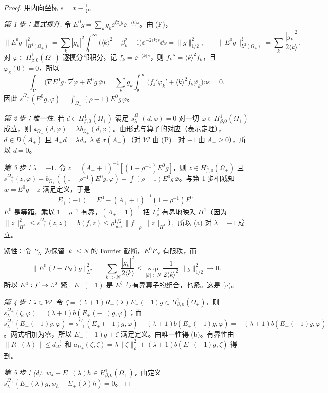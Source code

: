 \documentclass[11pt,a4paper,fontset=fandol]{ctexart}
\begin{document}
\begin{proof}
用内向坐标 $s=x-\tfrac12$。

\emph{第 1 步：显式提升.} 令 $E^0g=\sum_kg_k\ee^{\ii\beta_ky}\ee^{-\langle k\rangle s}$。由 (F)，
\[
\|E^0g\|_{H^1(\Omega_+)}^2=\sum_k|g_k|^2\int_0^\infty\bigl(\langle k\rangle^2+\beta_k^2+1\bigr)\ee^{-2\langle k\rangle s}\dd s=\|g\|_{1/2}^2,\qquad
\|E^0g\|_{L^2(\Omega_+)}^2=\sum_k\frac{|g_k|^2}{2\langle k\rangle}.
\]
对 $\varphi\in H^1_{\beta,0}(\Omega_+)$ 逐模分部积分。记 $f_k=\ee^{-\langle k\rangle s}$，则 $f_k''=\langle k\rangle^2f_k$，且 $\varphi_k(0)=0$，所以
\[
\int_{\Omega_+}\bigl(\nabla E^0g\cdot\overline{\nabla\varphi}+E^0g\,\overline\varphi\bigr)=\sum_kg_k\int_0^\infty\bigl(f_k'\overline{\varphi_k'}+\langle k\rangle^2f_k\overline{\varphi_k}\bigr)\dd s=0 .
\]
因此 $s^{\Omega_+}_{-1}(E^0g,\varphi)=\int_{\Omega_+}(\rho-1)E^0g\,\overline\varphi$。

\emph{第 2 步：唯一性.} 若 $d\in H^1_{\beta,0}(\Omega_+)$ 满足 $s^{\Omega_+}_\lambda(d,\varphi)=0$ 对一切 $\varphi\in H^1_{\beta,0}(\Omega_+)$ 成立，则 $a_{\Omega_+}(d,\varphi)=\lambda b_{\Omega_+}(d,\varphi)$。由形式与算子的对应（表示定理），$d\in D(A_+)$ 且 $A_+d=\lambda d$。$\lambda\notin\sigma(A_+)$（对 $\mathcal W$ 由 (P)，对 $-1$ 由 $A_+\ge0$），所以 $d=0$。

\emph{第 3 步：$\lambda=-1$.} 令 $z=(A_++1)^{-1}[(1-\rho^{-1})E^0g]$，则 $z\in H^1_{\beta,0}(\Omega_+)$ 且 $s^{\Omega_+}_{-1}(z,\varphi)=b_{\Omega_+}((1-\rho^{-1})E^0g,\varphi)=\int(\rho-1)E^0g\,\overline\varphi$。与第 1 步相减知 $w=E^0g-z$ 满足定义，于是
\[
E_+(-1)=E^0-(A_++1)^{-1}(1-\rho^{-1})E^0 .
\]
$E^0$ 是等距，乘以 $1-\rho^{-1}$ 有界，$(A_++1)^{-1}$ 把 $L^2_\rho$ 有界地映入 $H^1$（因为 $\|z\|_{H^1}^2\le s_{-1}^{\Omega_+}(z,z)=b(f,z)\le\rho_{\max}^{1/2}\|f\|_\rho\|z\|_{H^1}$），所以 (a) 对 $\lambda=-1$ 成立。

紧性：令 $P_N$ 为保留 $|k|\le N$ 的 Fourier 截断，$E^0P_N$ 有限秩，而
\[
\|E^0(I-P_N)g\|_{L^2}^2=\sum_{|k|>N}\frac{|g_k|^2}{2\langle k\rangle}\le\sup_{|k|>N}\frac1{2\langle k\rangle^2}\,\|g\|_{1/2}^2\to0 .
\]
所以 $E^0:\mathcal T\to L^2$ 紧，$E_+(-1)$ 是 $E^0$ 与有界算子的组合，也紧。这是 (c)。

\emph{第 4 步：$\lambda\in\mathcal W$.} 令 $\zeta=(\lambda+1)R_+(\lambda)E_+(-1)g\in H^1_{\beta,0}(\Omega_+)$，则 $s^{\Omega_+}_\lambda(\zeta,\varphi)=(\lambda+1)b(E_+(-1)g,\varphi)$；而
$s^{\Omega_+}_\lambda(E_+(-1)g,\varphi)=s^{\Omega_+}_{-1}(E_+(-1)g,\varphi)-(\lambda+1)b(E_+(-1)g,\varphi)=-(\lambda+1)b(E_+(-1)g,\varphi)$。两式相加为零，所以 $E_+(-1)g+\zeta$ 满足定义。由唯一性得 (b)。有界性由 $\|R_+(\lambda)\|\le d_{\mathcal W}^{-1}$ 和
$a_{\Omega_+}(\zeta,\zeta)=\lambda\|\zeta\|_\rho^2+(\lambda+1)b(E_+(-1)g,\zeta)$ 得到。

\emph{第 5 步：(d).} $w_h-E_+(\lambda)h\in H^1_{\beta,0}(\Omega_+)$，由定义 $s^{\Omega_+}_\lambda(E_+(\lambda)g,w_h-E_+(\lambda)h)=0$。
\end{proof}
\end{document}
